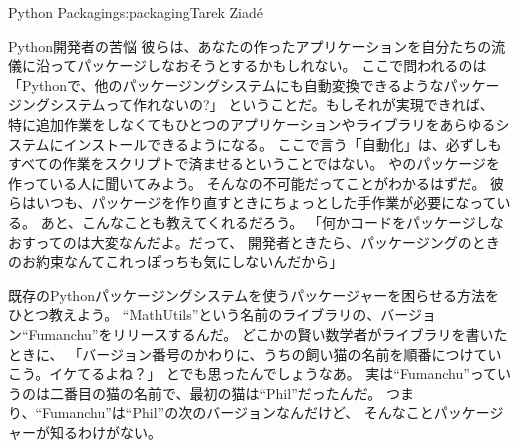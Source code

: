 \begin{aosachapter}{Python Packaging}{s:packaging}{Tarek Ziad\'{e}}
\begin{aosasect1}{Python開発者の苦悩}
彼らは、あなたの作ったアプリケーションを自分たちの流儀に沿ってパッケージしなおそうとするかもしれない。
ここで問われるのは
「Pythonで、他のパッケージングシステムにも自動変換できるようなパッケージングシステムって作れないの?」
ということだ。もしそれが実現できれば、
特に追加作業をしなくてもひとつのアプリケーションやライブラリをあらゆるシステムにインストールできるようになる。
ここで言う「自動化」は、必ずしもすべての作業をスクリプトで済ませるということではない。
やのパッケージを作っている人に聞いてみよう。
そんなの不可能だってことがわかるはずだ。
彼らはいつも、パッケージを作り直すときにちょっとした手作業が必要になっている。
あと、こんなことも教えてくれるだろう。
「何かコードをパッケージしなおすってのは大変なんだよ。だって、
開発者ときたら、パッケージングのときのお約束なんてこれっぽっちも気にしないんだから」

既存のPythonパッケージングシステムを使うパッケージャーを困らせる方法をひとつ教えよう。
``MathUtils''という名前のライブラリの、バージョン``Fumanchu''をリリースするんだ。
どこかの賢い数学者がライブラリを書いたときに、
「バージョン番号のかわりに、うちの飼い猫の名前を順番につけていこう。イケてるよね？」
とでも思ったんでしょうなあ。
実は``Fumanchu''っていうのは二番目の猫の名前で、最初の猫は``Phil''だったんだ。
つまり、``Fumanchu''は``Phil''の次のバージョンなんだけど、
そんなことパッケージャーが知るわけがない。


\end{aosasect1}
\end{aosachapter}
